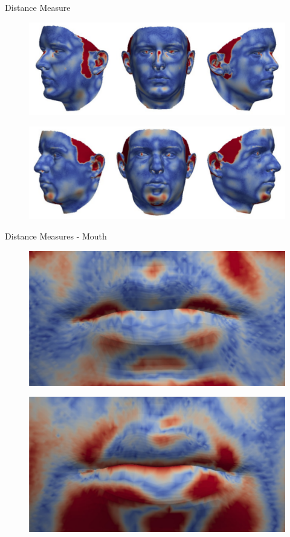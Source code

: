\documentclass[xcolor=x11names,compress]{beamer}
\begin{document}
\begin{frame}{Distance Measure}
\begin{figure}
        \centering
        \includegraphics[width=.8\textwidth]{../resources/img/00029_distmap.pdf}
\end{figure}
\begin{figure}
        \centering
        \includegraphics[width=.8\textwidth]{../resources/img/00303_distmap.pdf}
\end{figure}
\end{frame}

\begin{frame}{Distance Measures - Mouth}
\begin{figure}
        \centering
        \includegraphics[width=.6\textwidth]{../resources/img/00029_dist_mouth_0_1_cropped.pdf}
\end{figure}
\begin{figure}
        \centering
        \includegraphics[width=.6\textwidth]{../resources/img/00303_dist_mouth_0_1_cropped.pdf}
\end{figure}
\end{frame}
\end{document}
